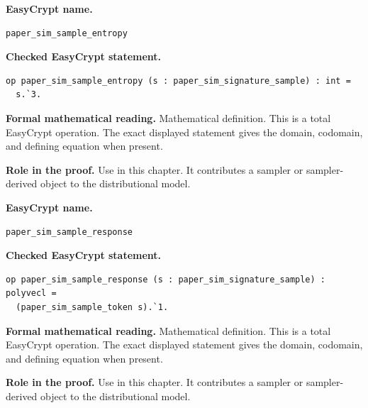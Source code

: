 \begin{formaldefinition}
\noindent\textbf{EasyCrypt name.}
\begin{lstlisting}[language=EasyCrypt,basicstyle=\ttfamily\scriptsize]
paper_sim_sample_entropy
\end{lstlisting}
\noindent\textbf{Checked EasyCrypt statement.}
\begin{lstlisting}[language=EasyCrypt,basicstyle=\ttfamily\scriptsize]
op paper_sim_sample_entropy (s : paper_sim_signature_sample) : int =
  s.`3.
\end{lstlisting}
\noindent\textbf{Formal mathematical reading.}
Mathematical definition. This is a total EasyCrypt operation.  The exact displayed statement gives the domain, codomain, and defining equation when present.

\noindent\textbf{Role in the proof.}
Use in this chapter. It contributes a sampler or sampler-derived object to the distributional model.

\end{formaldefinition}

\begin{formaldefinition}
\noindent\textbf{EasyCrypt name.}
\begin{lstlisting}[language=EasyCrypt,basicstyle=\ttfamily\scriptsize]
paper_sim_sample_response
\end{lstlisting}
\noindent\textbf{Checked EasyCrypt statement.}
\begin{lstlisting}[language=EasyCrypt,basicstyle=\ttfamily\scriptsize]
op paper_sim_sample_response (s : paper_sim_signature_sample) : polyvecl =
  (paper_sim_sample_token s).`1.
\end{lstlisting}
\noindent\textbf{Formal mathematical reading.}
Mathematical definition. This is a total EasyCrypt operation.  The exact displayed statement gives the domain, codomain, and defining equation when present.

\noindent\textbf{Role in the proof.}
Use in this chapter. It contributes a sampler or sampler-derived object to the distributional model.

\end{formaldefinition}

